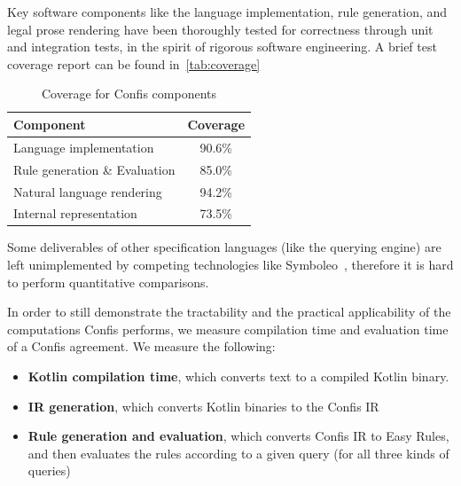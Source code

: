 Key software components like the language implementation, rule generation, and legal prose rendering have been thoroughly tested for correctness through unit and integration tests, in the spirit of rigorous software engineering.
A brief test coverage report can be found in~\autoref{tab:coverage}

\begin{table}[h]
    \centering
    \setlength{\tabcolsep}{8pt} %
    \renewcommand{\arraystretch}{1.2} %
    \begin{tabular}{l|c}
        \hline
        \textbf{Component}            & \textbf{Coverage} \\
        \hline
        \hline
        Language implementation       & 90.6\%            \\
        \hline
        Rule generation \& Evaluation & 85.0\%            \\
        \hline
        Natural language rendering    & 94.2\%            \\
        \hline
        Internal representation       & 73.5\%            \\
        \hline
    \end{tabular}
    \caption{Coverage for Confis components}
    \label{tab:coverage}
\end{table}

Some deliverables of other specification languages (like the querying engine) are left unimplemented by competing technologies like Symboleo~\cite{symboleo2020}, therefore it is hard to perform quantitative comparisons.

In order to still demonstrate the tractability and the practical applicability of the computations Confis performs, we measure compilation time and evaluation time of a Confis agreement.
We measure the following:
\begin{itemize}
    \item \textbf{Kotlin compilation time}, which converts text to a compiled Kotlin binary.
    \item \textbf{IR generation}, which converts Kotlin binaries to the Confis IR
    \item \textbf{Rule generation and evaluation}, which converts Confis IR to Easy Rules, and then evaluates the rules according to a given query (for all three kinds of queries)
\end{itemize}

